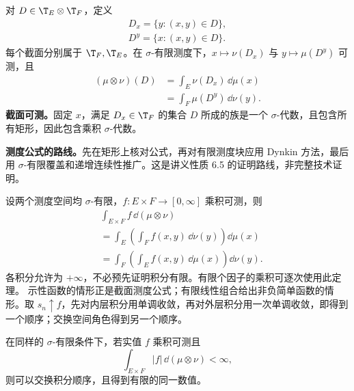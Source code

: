 对 $D\in\T_E\otimes\T_F$，定义
\[
\begin{gathered}
D_x=\{y:(x,y)\in D\},\\
D^y=\{x:(x,y)\in D\}.
\end{gathered}
\]
每个截面分别属于 $\T_F,\T_E$。在 $\sigma$-有限测度下，$x\mapsto\nu(D_x)$ 与 $y\mapsto\mu(D^y)$ 可测，且
\[
\begin{aligned}
(\mu\otimes\nu)(D)
&=\int_E\nu(D_x)\,\dd\mu(x)\\
&=\int_F\mu(D^y)\,\dd\nu(y).
\end{aligned}
\]
\textbf{截面可测。}固定 $x$，满足 $D_x\in\T_F$ 的集合 $D$ 所成的族是一个 $\sigma$-代数，且包含所有矩形，因此包含乘积 $\sigma$-代数。

\textbf{测度公式的路线。}先在矩形上核对公式，再对有限测度块应用 Dynkin 方法，最后用 $\sigma$-有限覆盖和递增连续性推广。这是讲义性质 6.5 的证明路线，非完整技术证明。

设两个测度空间均 $\sigma$-有限，$f:E\times F\to[0,\infty]$ 乘积可测，则
\[
\begin{aligned}
&\int_{E\times F}f\,\dd(\mu\otimes\nu)\\
&=\int_E\left(\int_F f(x,y)\,\dd\nu(y)\right)\dd\mu(x)\\
&=\int_F\left(\int_E f(x,y)\,\dd\mu(x)\right)\dd\nu(y).
\end{aligned}
\]
各积分允许为 $+\infty$，不必预先证明积分有限。有限个因子的乘积可逐次使用此定理。
示性函数的情形正是截面测度公式；有限线性组合给出非负简单函数的情形。取 $s_n\uparrow f$，先对内层积分用单调收敛，再对外层积分用一次单调收敛，即得到一个顺序；交换空间角色得到另一个顺序。

在同样的 $\sigma$-有限条件下，若实值 $f$ 乘积可测且
\[
\int_{E\times F}|f|\,\dd(\mu\otimes\nu)<\infty,
\]
则可以交换积分顺序，且得到有限的同一数值。

